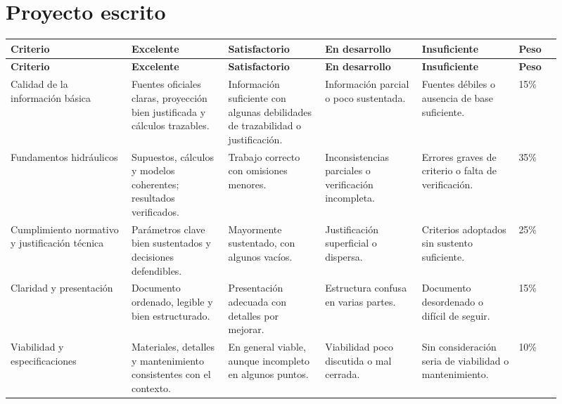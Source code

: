 \documentclass[11pt]{article}
\begin{document}

\section{Proyecto escrito}
\small
\begin{longtable}{p{0.20\linewidth} p{0.16\linewidth} p{0.16\linewidth} p{0.16\linewidth} p{0.16\linewidth} p{0.07\linewidth}}
\toprule
\textbf{Criterio} & \textbf{Excelente} & \textbf{Satisfactorio} & \textbf{En desarrollo} & \textbf{Insuficiente} & \textbf{Peso} \\
\midrule
\endfirsthead
\toprule
\textbf{Criterio} & \textbf{Excelente} & \textbf{Satisfactorio} & \textbf{En desarrollo} & \textbf{Insuficiente} & \textbf{Peso} \\
\midrule
\endhead
Calidad de la informaci\'on b\'asica & Fuentes oficiales claras, proyecci\'on bien justificada y c\'alculos trazables. & Informaci\'on suficiente con algunas debilidades de trazabilidad o justificaci\'on. & Informaci\'on parcial o poco sustentada. & Fuentes d\'ebiles o ausencia de base suficiente. & 15\% \\
Fundamentos hidr\'aulicos & Supuestos, c\'alculos y modelos coherentes; resultados verificados. & Trabajo correcto con omisiones menores. & Inconsistencias parciales o verificaci\'on incompleta. & Errores graves de criterio o falta de verificaci\'on. & 35\% \\
Cumplimiento normativo y justificaci\'on t\'ecnica & Par\'ametros clave bien sustentados y decisiones defendibles. & Mayormente sustentado, con algunos vac\'ios. & Justificaci\'on superficial o dispersa. & Criterios adoptados sin sustento suficiente. & 25\% \\
Claridad y presentaci\'on & Documento ordenado, legible y bien estructurado. & Presentaci\'on adecuada con detalles por mejorar. & Estructura confusa en varias partes. & Documento desordenado o dif\'icil de seguir. & 15\% \\
Viabilidad y especificaciones & Materiales, detalles y mantenimiento consistentes con el contexto. & En general viable, aunque incompleto en algunos puntos. & Viabilidad poco discutida o mal cerrada. & Sin consideraci\'on seria de viabilidad o mantenimiento. & 10\% \\
\bottomrule
\end{longtable}
\normalsize
\end{document}
